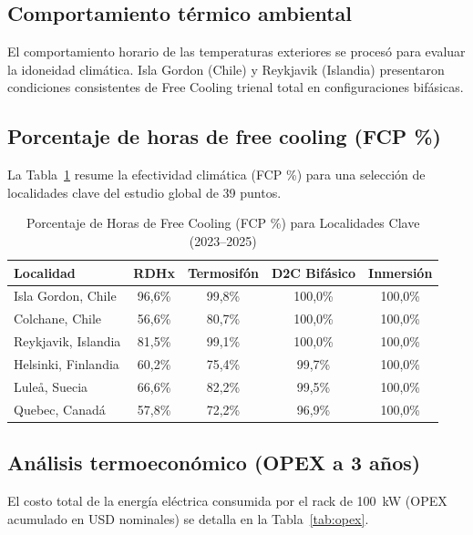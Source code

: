 \documentclass[journal]{IEEEtran}
\begin{document}
\subsection{Comportamiento t\'ermico ambiental}
El comportamiento horario de las temperaturas exteriores se proces\'o para evaluar la idoneidad clim\'atica. Isla Gordon (Chile) y Reykjavik (Islandia) presentaron condiciones consistentes de Free Cooling trienal total en configuraciones bif\'asicas.

\subsection{Porcentaje de horas de free cooling (FCP \%)}
La Tabla~\ref{tab:fcp} resume la efectividad clim\'atica (FCP \%) para una selecci\'on de localidades clave del estudio global de 39 puntos.

\begin{table}[htbp]
\caption{Porcentaje de Horas de Free Cooling (FCP \%) para Localidades Clave (2023--2025)}
\label{tab:fcp}
\centering
\begin{tabular}{lcccc}
\toprule
Localidad & RDHx & Termosif\'on & D2C Bif\'asico & Inmersi\'on \\
\midrule
Isla Gordon, Chile & 96,6\% & 99,8\% & 100,0\% & 100,0\% \\
Colchane, Chile & 56,6\% & 80,7\% & 100,0\% & 100,0\% \\
Reykjavik, Islandia & 81,5\% & 99,1\% & 100,0\% & 100,0\% \\
Helsinki, Finlandia & 60,2\% & 75,4\% & 99,7\% & 100,0\% \\
Lule\aa, Suecia & 66,6\% & 82,2\% & 99,5\% & 100,0\% \\
Quebec, Canad\'a & 57,8\% & 72,2\% & 96,9\% & 100,0\% \\
\bottomrule
\end{tabular}
\end{table}

\subsection{An\'alisis termoecon\'omico (OPEX a 3 a\~nos)}
El costo total de la energ\'ia el\'ectrica consumida por el rack de 100~kW (OPEX acumulado en USD nominales) se detalla en la Tabla~\ref{tab:opex}.
\end{document}
